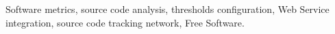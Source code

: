 \begin{abstract}



\end{abstract}
\vspace{1\baselineskip}

\begin{keywords}
Software metrics, source code analysis, thresholds configuration,
Web Service integration, source code tracking network, Free Software.
\end{keywords}



